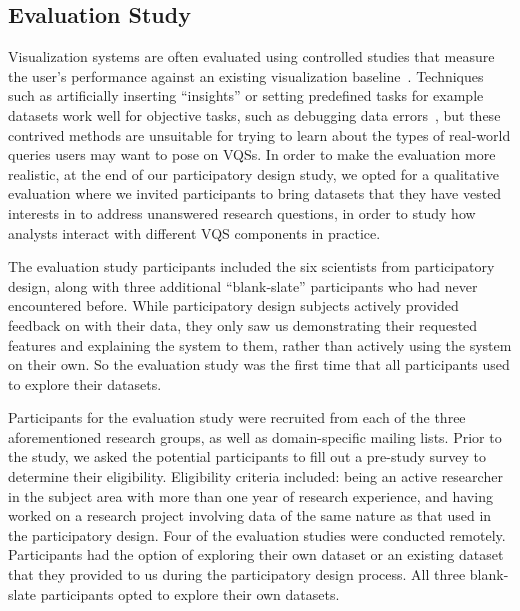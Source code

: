 \subsection{Evaluation Study}
\par Visualization systems are often evaluated using controlled studies that measure the user's performance against an existing visualization baseline~\cite{Plaisant2004}. Techniques such as artificially inserting ``insights'' or setting predefined tasks for example datasets work well for objective tasks, such as debugging data errors~\cite{kandel2011wrangler,Patel2010}, but these contrived methods are unsuitable for trying to learn about the types of real-world queries users may want to pose on VQSs. %
In order to make the evaluation more realistic, at the end of our participatory design study, we opted for a qualitative evaluation where we invited participants to bring datasets that they have vested interests in to address unanswered research questions, in order to study how analysts interact with different VQS components in practice.
\par The evaluation study participants included the six scientists from participatory design, along with three additional ``blank-slate'' participants who had never encountered \zv before. While participatory design subjects actively provided feedback on \zv with their data, they only saw us demonstrating their requested features and explaining the system to them, rather than actively using the system on their own. So the evaluation study was the first time that all participants used \zv to explore their datasets.
\par Participants for the evaluation study were recruited from each of the three aforementioned research groups, as well as domain-specific mailing lists. Prior to the study, we asked the potential participants to fill out a pre-study survey to determine their eligibility. Eligibility criteria included: being an active researcher in the subject area with more than one year of research experience, and having worked on a research project involving data of the same nature as that used in the participatory design. Four of the evaluation studies were conducted remotely. Participants had the option of exploring their own dataset or an existing dataset that they provided to us during the participatory design process. All three blank-slate participants opted to explore their own datasets. %
